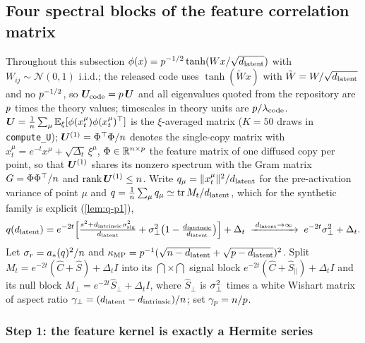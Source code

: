 \subsection{Four spectral blocks of the feature correlation matrix}
\label{app:theory-fourbulk}

Throughout this subsection $\phi(x)=p^{-1/2}\tanh(Wx/\sqrt{d_{\mathrm{latent}}})$ with $W_{ij}\sim\mathcal N(0,1)$ i.i.d.; the released code uses $\tanh(\tilde Wx)$ with $\tilde W=W/\sqrt{d_{\mathrm{latent}}}$ and no $p^{-1/2}$, so $\bm{U}_{\mathrm{code}}=p\,\bm{U}$ and all eigenvalues quoted from the repository are $p$ times the theory values; timescales in theory units are $p/\lambda_{\mathrm{code}}$. $\bm{U}=\tfrac1{n}\sum_\mu\mathbb{E}_\xi[\phi(x_t^\mu)\phi(x_t^\mu)^\top]$ is the $\xi$-averaged matrix ($K=50$ draws in \texttt{compute\_U}); $\bm{U}^{(1)}=\Phi^\top\Phi/n$ denotes the single-copy matrix with $x_t^\mu=e^{-t}x^\mu+\sqrt{\Delta_t}\,\xi^\mu$, $\Phi\in\mathbb{R}^{n\times p}$ the feature matrix of one diffused copy per point, so that $\bm{U}^{(1)}$ shares its nonzero spectrum with the Gram matrix $G=\Phi\Phi^\top/n$ and $\operatorname{rank}\bm{U}^{(1)}\le n$. Write $q_\mu=\|x_t^\mu\|^2/d_{\mathrm{latent}}$ for the pre-activation variance of point $\mu$ and $q=\tfrac1{n}\sum_\mu q_\mu\simeq\operatorname{tr}M_t/d_{\mathrm{latent}}$, which for the synthetic family is explicit (\cref{lem:q-p1}),
\begin{equation}\label{eq:fourbulk-q}
  q(d_{\mathrm{latent}})=e^{-2t}\Bigl[\tfrac{s^2+d_{\mathrm{intrinsic}}\sigma_{\mathrm{sig}}^2}{d_{\mathrm{latent}}}+\sigma_{\perp}^2\bigl(1-\tfrac{d_{\mathrm{intrinsic}}}{d_{\mathrm{latent}}}\bigr)\Bigr]+\Delta_t
  \;\xrightarrow{\;d_{\mathrm{latent}}\to\infty\;}\; e^{-2t}\sigma_{\perp}^2+\Delta_t .
\end{equation}
Let $\sigma_r=a_*(q)^2/n$ and $\kappa_{\mathrm{MP}}=p^{-1}(\sqrt{n-d_{\mathrm{latent}}}+\sqrt{p-d_{\mathrm{latent}}})^2$. Split $M_t=e^{-2t}(\hat C+\hat S)+\Delta_t I$ into its $\dint\times\dint$ signal block $e^{-2t}(\hat C+\hat S_\parallel)+\Delta_t I$ and its null block $M_\perp=e^{-2t}\hat S_\perp+\Delta_t I$, where $\hat S_\perp$ is $\sigma_{\perp}^2$ times a white Wishart matrix of aspect ratio $\gamma_\perp=(d_{\mathrm{latent}}-d_{\mathrm{intrinsic}})/n$; set $\gamma_p=n/p$.

\subsubsection{Step 1: the feature kernel is exactly a Hermite series}

